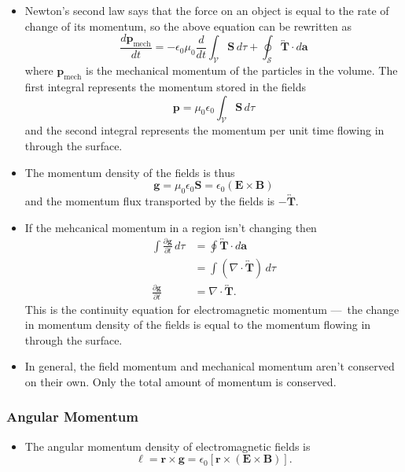 \documentclass{article}
\renewcommand{\vec}[1]{\boldsymbol{\mathbf{#1}}}
\newcommand{\tensor}[1]{\overleftrightarrow{\boldsymbol{\mathbf{#1}}}}
\begin{document}
\begin{itemize}
  \item Newton's second law says that the force on an object is equal to the rate of change of its momentum, so the above equation can be rewritten as \[\frac{d \vec{p}_\text{mech}}{d t} = -\epsilon_0 \mu_0 \frac{d}{d t} \int_\mathcal{V} \vec{S} \,d \tau + \oint_\mathcal{S} \tensor{T} \cdot d \vec{a}\] where $\vec{p}_\text{mech}$ is the mechanical momentum of the particles in the volume. The first integral represents the momentum stored in the fields \[\vec{p} = \mu_0 \epsilon_0 \int_\mathcal{V} \vec{S} \,d \tau\] and the second integral represents the momentum per unit time flowing in through the surface.

  \item The momentum density of the fields is thus \[\vec{g} = \mu_0 \epsilon_0 \vec{S} = \epsilon_0 (\vec{E} \times \vec{B})\] and the momentum flux transported by the fields is $-\tensor{T}$.

  \item If the mehcanical momentum in a region isn't changing then \begin{align*}
          \int \frac{\partial \vec{g}}{\partial t} \,d \tau & = \oint \tensor{T} \cdot d \vec{a}        \\
                                                            & = \int (\nabla \cdot \tensor{T}) \,d \tau \\
          \frac{\partial \vec{g}}{\partial t}               & = \nabla \cdot \tensor{T}.
        \end{align*} This is the continuity equation for electromagnetic momentum — the change in momentum density of the fields is equal to the momentum flowing in through the surface.

  \item In general, the field momentum and mechanical momentum aren't conserved on their own. Only the total amount of momentum is conserved.
\end{itemize}

\subsubsection{Angular Momentum}

\begin{itemize}
  \item The angular momentum density of electromagnetic fields is \[\ell = \vec{r} \times \vec{g} = \epsilon_0 [\vec{r} \times (\vec{E} \times \vec{B})].\]
\end{itemize}
\end{document}
